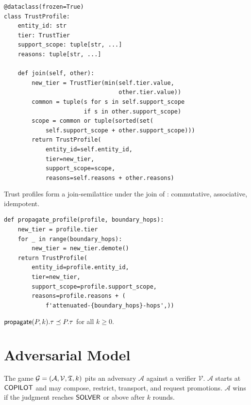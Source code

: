 \documentclass[11pt]{article}
\begin{document}
\begin{lstlisting}[caption={Trust profile implementation.},
                   label=lst:profile]
@dataclass(frozen=True)
class TrustProfile:
    entity_id: str
    tier: TrustTier
    support_scope: tuple[str, ...]
    reasons: tuple[str, ...]

    def join(self, other):
        new_tier = TrustTier(min(self.tier.value,
                                 other.tier.value))
        common = tuple(s for s in self.support_scope
                       if s in other.support_scope)
        scope = common or tuple(sorted(set(
            self.support_scope + other.support_scope)))
        return TrustProfile(
            entity_id=self.entity_id,
            tier=new_tier,
            support_scope=scope,
            reasons=self.reasons + other.reasons)
\end{lstlisting}

\begin{proposition}
\label{prop:profile-semilattice}
Trust profiles form a join-semilattice under the join of
: commutative, associative, idempotent.
\end{proposition}

\begin{lstlisting}[caption={Profile propagation with attenuation.},
                   label=lst:propagation]
def propagate_profile(profile, boundary_hops):
    new_tier = profile.tier
    for _ in range(boundary_hops):
        new_tier = new_tier.demote()
    return TrustProfile(
        entity_id=profile.entity_id,
        tier=new_tier,
        support_scope=profile.support_scope,
        reasons=profile.reasons + (
            f'attenuated-{boundary_hops}-hops',))
\end{lstlisting}

\begin{proposition}
\label{prop:propagation}
$\mathsf{propagate}(P, k).\tau \preceq P.\tau$ for all $k \geq 0$.
\end{proposition}


\section{Adversarial Model}\label{sec:adversarial}

\begin{definition}\label{def:trust-game}
The game $\mathcal{G} = (\mathcal{A}, \mathcal{V}, \mathfrak{T}, k)$
pits an adversary $\mathcal{A}$ against a verifier $\mathcal{V}$.
$\mathcal{A}$ starts at $\mathsf{COPILOT}$ and may compose, restrict,
transport, and request promotions.  $\mathcal{A}$ wins if the
judgment reaches $\mathsf{SOLVER}$ or above after $k$ rounds.
\end{definition}
\end{document}
